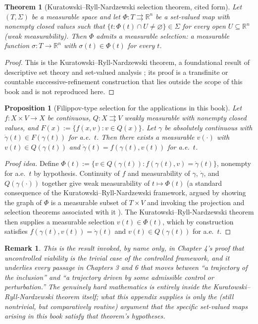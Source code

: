 \documentclass[11pt]{report}
\newtheorem{proposition}{Proposition}[chapter]
\newtheorem{theorem}{Theorem}[chapter]
\newtheorem{remark}{Remark}[chapter]
\begin{document}
\begin{theorem}[Kuratowski--Ryll-Nardzewski selection theorem, cited form]
Let $(T,\Sigma)$ be a measurable space and let $\Phi : T \rightrightarrows \mathbb{R}^n$
be a set-valued map with nonempty closed values such that
$\{t : \Phi(t) \cap U \neq \varnothing\} \in \Sigma$ for every open
$U \subseteq \mathbb{R}^n$ (weak measurability). Then $\Phi$ admits a
measurable selection: a measurable function $\sigma : T \to \mathbb{R}^n$
with $\sigma(t) \in \Phi(t)$ for every $t$.
\end{theorem}

\begin{proof}
This is the Kuratowski--Ryll-Nardzewski theorem, a foundational result
of descriptive set theory and set-valued analysis \cite{krn1965}; its
proof is a transfinite or countable successive-refinement construction
that lies outside the scope of this book and is not reproduced here.
\end{proof}

\begin{proposition}[Filippov-type selection for the applications in this book]
\label{prop:filippov}
Let $f : X \times V \to X$ be continuous, $Q : X \rightrightarrows V$
weakly measurable with nonempty closed values, and $F(x) := \{f(x,v) :
v \in Q(x)\}$. Let $\gamma$ be absolutely continuous with
$\dot\gamma(t) \in F(\gamma(t))$ for a.e.\ $t$. Then there exists a
measurable $v(\cdot)$ with $v(t) \in Q(\gamma(t))$ and
$\dot\gamma(t) = f(\gamma(t), v(t))$ for a.e.\ $t$.
\end{proposition}
\begin{proof}[Proof idea]
Define $\Phi(t) := \{v \in Q(\gamma(t)) : f(\gamma(t),v) = \dot\gamma(t)\}$,
nonempty for a.e.\ $t$ by hypothesis. Continuity of $f$ and
measurability of $\gamma$, $\dot\gamma$, and $Q(\gamma(\cdot))$ together
give weak measurability of $t \mapsto \Phi(t)$ (a standard consequence
of the Kuratowski--Ryll-Nardzewski framework, argued by showing the
graph of $\Phi$ is a measurable subset of $T \times V$ and invoking the
projection and selection theorems associated with it
\cite{aubinframkowska1990}). The Kuratowski--Ryll-Nardzewski theorem
then supplies a measurable selection $v(t) \in \Phi(t)$, which by
construction satisfies $f(\gamma(t),v(t)) = \dot\gamma(t)$ and
$v(t) \in Q(\gamma(t))$ for a.e.\ $t$.
\end{proof}

\begin{remark}
This is the result invoked, by name only, in Chapter 4's proof that
uncontrolled viability is the trivial case of the controlled framework,
and it underlies every passage in Chapters 3 and 6 that moves between
``a trajectory of the inclusion'' and ``a trajectory driven by some
admissible control or perturbation.'' The genuinely hard mathematics is
entirely inside the Kuratowski--Ryll-Nardzewski theorem itself; what
this appendix supplies is only the (still nontrivial, but comparatively
routine) argument that the specific set-valued maps arising in this
book satisfy that theorem's hypotheses.
\end{remark}
\end{document}
